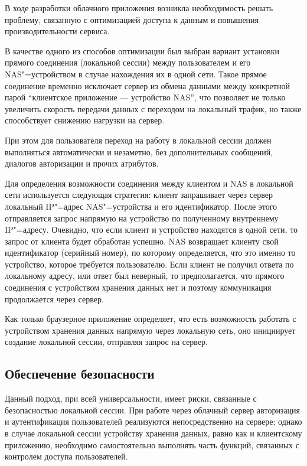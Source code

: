 \documentclass[10pt, a5paper]{article}
\begin{document}
В ходе разработки облачного приложения возникла необходимость решать проблему, связанную с оптимизацией доступа к данным и повышения производительности сервиса.

В качестве одного из способов оптимизации был выбран вариант установки прямого соединения (локальной сессии) между пользователем и его NAS"=устройством в случае нахождения их в одной сети. Такое прямое соединение временно исключает сервер из обмена данными между конкретной парой ``клиентское приложение --- устройство NAS'', что  позволяет не только увеличить скорость передачи данных с переходом на локальный трафик, но также способствует снижению нагрузки на сервер.

При этом для пользователя переход на работу в локальной сессии должен выполняться автоматически и незаметно, без дополнительных сообщений, диалогов авторизации и прочих атрибутов.

Для определения возможности соединения между клиентом и NAS в локальной сети используется следующая стратегия: клиент запрашивает через сервер локальный IP"=адрес NAS"=устройства и его идентификатор.  После этого отправляется запрос напрямую на устройство по полученному внутреннему IP"=адресу. Очевидно, что если клиент и устройство находятся в одной сети, то запрос от клиента будет обработан успешно. NAS возвращает клиенту свой идентификатор (серийный номер), по которому определяется, что это именно то устройство, которое требуется пользователю. Если клиент не получил ответа по локальному адресу, или ответ был неверный, то предполагается, что прямого соединения с устройством хранения данных нет и поэтому коммуникация продолжается через сервер.

Как только браузерное приложение определяет, что есть возможность работать с устройством хранения данных напрямую через локальную сеть, оно инициирует создание локальной сессии, отправляя запрос на сервер.

\subsection*{Обеспечение безопасности}

Данный подход, при всей универсальности, имеет риски, связанные с безопасностью локальной сессии. При работе через облачный сервер авторизация и аутентификация пользователей реализуются непосредственно на сервере; однако в случае локальной сессии устройству хранения данных, равно как и клиентскому приложению, необходимо самостоятельно выполнять часть функций, связанных с контролем доступа пользователей.
\end{document}
